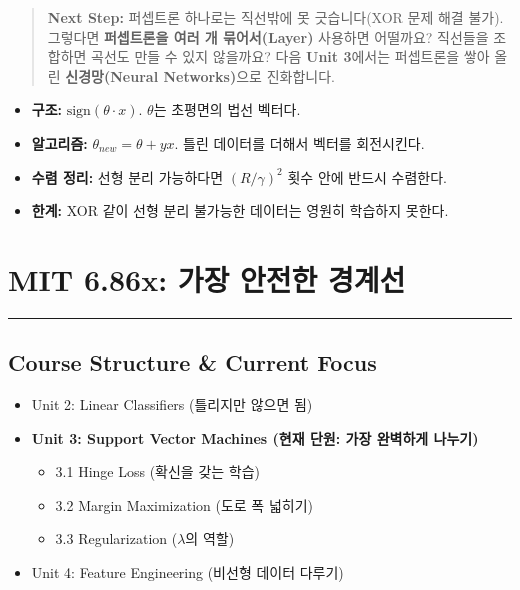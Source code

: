 \documentclass[11pt,a4paper]{book}
\theoremstyle{definition}
\begin{document}
\vspace{1cm}
\begin{quote}
\textbf{Next Step:} 퍼셉트론 하나로는 직선밖에 못 긋습니다(XOR 문제 해결 불가). 그렇다면 \textbf{퍼셉트론을 여러 개 묶어서(Layer)} 사용하면 어떨까요? 직선들을 조합하면 곡선도 만들 수 있지 않을까요? 다음 \textbf{Unit 3}에서는 퍼셉트론을 쌓아 올린 \textbf{신경망(Neural Networks)}으로 진화합니다.
\end{quote}

\begin{summarybox}[title={Unit 2 핵심 요약}]
\begin{itemize}
    \item \textbf{구조:} $\text{sign}(\theta \cdot x)$. $\theta$는 초평면의 법선 벡터다.
    \item \textbf{알고리즘:} $\theta_{new} = \theta + yx$. 틀린 데이터를 더해서 벡터를 회전시킨다.
    \item \textbf{수렴 정리:} 선형 분리 가능하다면 $(R/\gamma)^2$ 횟수 안에 반드시 수렴한다.
    \item \textbf{한계:} XOR 같이 선형 분리 불가능한 데이터는 영원히 학습하지 못한다.
\end{itemize}
\end{summarybox}


\chapter{MIT 6.86x: 가장 안전한 경계선}
\label{ch:lecture3}


\vspace{1cm}
\hrule
\vspace{1cm}

\section*{Course Structure \& Current Focus}
\begin{itemize}
    \item Unit 2: Linear Classifiers (틀리지만 않으면 됨)
    \item \textbf{\textcolor{mainblue}{Unit 3: Support Vector Machines (현재 단원: 가장 완벽하게 나누기)}}
    \begin{itemize}
        \item 3.1 Hinge Loss (확신을 갖는 학습)
        \item 3.2 Margin Maximization (도로 폭 넓히기)
        \item 3.3 Regularization ($\lambda$의 역할)
    \end{itemize}
    \item Unit 4: Feature Engineering (비선형 데이터 다루기)
\end{itemize}
\end{document}
